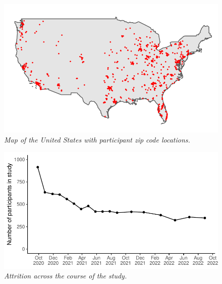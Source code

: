 \documentclass[
  man, donotrepeattitle,mask,floatsintext]{apa6}
\begin{document}
\begin{figure}
\centering
\includegraphics{manuscript_files/figure-latex/plotUSMap-1.pdf}
\caption{\label{fig:plotUSMap}\emph{Map of the United States with participant zip code locations.}}
\end{figure}

\newpage



\begin{figure}
\centering
\includegraphics{manuscript_files/figure-latex/plotAttrition-1.pdf}
\caption{\label{fig:plotAttrition}\emph{Attrition across the course of the study.}}
\end{figure}

\newpage
\end{document}
